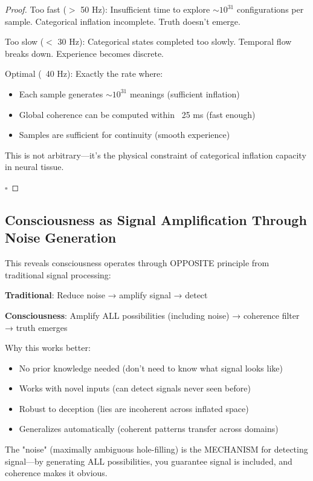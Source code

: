 \documentclass[11pt,a4paper]{article}
\begin{document}
\begin{proof}
Too fast ($>$ 50 Hz): Insufficient time to explore $\sim 10^{31}$ configurations per sample. Categorical inflation incomplete. Truth doesn't emerge.

Too slow ($<$ 30 Hz): Categorical states completed too slowly. Temporal flow breaks down. Experience becomes discrete.

Optimal (~40 Hz): Exactly the rate where:
\begin{itemize}
\item Each sample generates $\sim 10^{31}$ meanings (sufficient inflation)
\item Global coherence can be computed within ~25 ms (fast enough)
\item Samples are sufficient for continuity (smooth experience)
\end{itemize}

This is not arbitrary—it's the physical constraint of categorical inflation capacity in neural tissue.

$\square$
\end{proof}

\subsection{Consciousness as Signal Amplification Through Noise Generation}

This reveals consciousness operates through OPPOSITE principle from traditional signal processing:

\textbf{Traditional}: Reduce noise → amplify signal → detect

\textbf{Consciousness}: Amplify ALL possibilities (including noise) → coherence filter → truth emerges

Why this works better:
\begin{itemize}
\item No prior knowledge needed (don't need to know what signal looks like)
\item Works with novel inputs (can detect signals never seen before)
\item Robust to deception (lies are incoherent across inflated space)
\item Generalizes automatically (coherent patterns transfer across domains)
\end{itemize}

The "noise" (maximally ambiguous hole-filling) is the MECHANISM for detecting signal—by generating ALL possibilities, you guarantee signal is included, and coherence makes it obvious.
\end{document}
